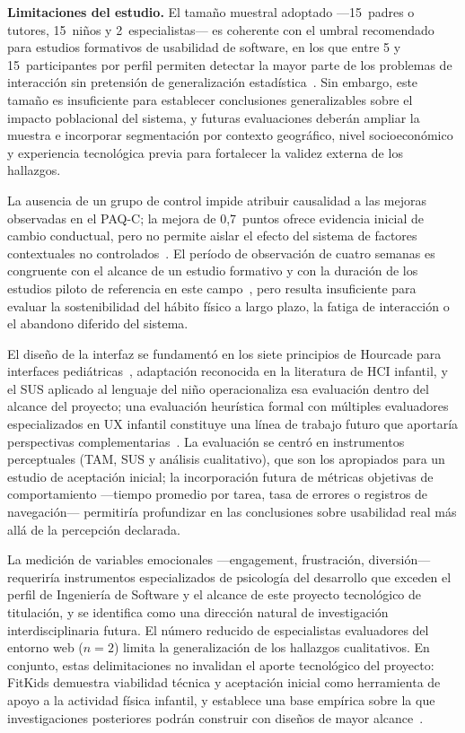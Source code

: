 			\textbf{Limitaciones del estudio.} El tamaño muestral adoptado ---15~padres o tutores, 15~niños y 2~especialistas--- es coherente con el umbral recomendado para estudios formativos de usabilidad de software, en los que entre 5 y 15~participantes por perfil permiten detectar la mayor parte de los problemas de interacción sin pretensión de generalización estadística~\cite{Putnam2020,Sauro2016}. Sin embargo, este tamaño es insuficiente para establecer conclusiones generalizables sobre el impacto poblacional del sistema, y futuras evaluaciones deberán ampliar la muestra e incorporar segmentación por contexto geográfico, nivel socioeconómico y experiencia tecnológica previa para fortalecer la validez externa de los hallazgos.
			
			La ausencia de un grupo de control impide atribuir causalidad a las mejoras observadas en el PAQ-C; la mejora de 0,7~puntos ofrece evidencia inicial de cambio conductual, pero no permite aislar el efecto del sistema de factores contextuales no controlados~\cite{Creswell2018}. El período de observación de cuatro semanas es congruente con el alcance de un estudio formativo y con la duración de los estudios piloto de referencia en este campo~\cite{Domin2022,Schoeppe2017}, pero resulta insuficiente para evaluar la sostenibilidad del hábito físico a largo plazo, la fatiga de interacción o el abandono diferido del sistema.
			
			El diseño de la interfaz se fundamentó en los siete principios de Hourcade para interfaces pediátricas~\cite{Hourcade2015}, adaptación reconocida en la literatura de HCI infantil, y el SUS aplicado al lenguaje del niño operacionaliza esa evaluación dentro del alcance del proyecto; una evaluación heurística formal con múltiples evaluadores especializados en UX infantil constituye una línea de trabajo futuro que aportaría perspectivas complementarias~\cite{Nielsen1994}. La evaluación se centró en instrumentos perceptuales (TAM, SUS y análisis cualitativo), que son los apropiados para un estudio de aceptación inicial; la incorporación futura de métricas objetivas de comportamiento ---tiempo promedio por tarea, tasa de errores o registros de navegación--- permitiría profundizar en las conclusiones sobre usabilidad real más allá de la percepción declarada.
			
			La medición de variables emocionales ---engagement, frustración, diversión--- requeriría instrumentos especializados de psicología del desarrollo que exceden el perfil de Ingeniería de Software y el alcance de este proyecto tecnológico de titulación, y se identifica como una dirección natural de investigación interdisciplinaria futura. El número reducido de especialistas evaluadores del entorno web ($n = 2$) limita la generalización de los hallazgos cualitativos. En conjunto, estas delimitaciones no invalidan el aporte tecnológico del proyecto: FitKids demuestra viabilidad técnica y aceptación inicial como herramienta de apoyo a la actividad física infantil, y establece una base empírica sobre la que investigaciones posteriores podrán construir con diseños de mayor alcance~\cite{GuerreroUlloa2024,Schoeppe2017}.

